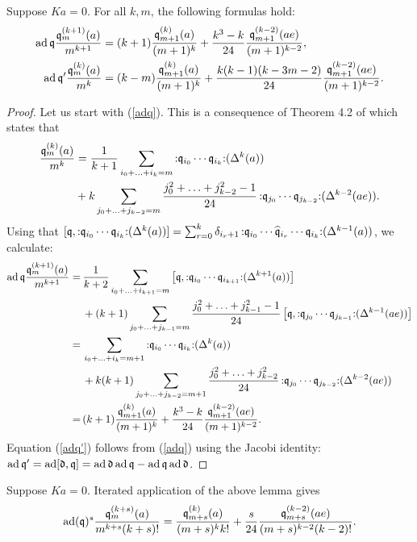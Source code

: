 \begin{lemma}
Suppose $Ka=0$.
For all $k,m$, the following formulas hold:
\begin{align}
\label{adq}
\operatorname{ad} \mathfrak{q}  \frac{\mathfrak{q}_m^{(k+1)}(a)}{m^{k+1}} & = (k+1)  \frac{\mathfrak{q}_{m+1}^{(k)}(a)}{(m+1)^{k}} + \frac{k^3-k}{24}\frac{\mathfrak{q}_{m+1}^{(k-2)}(ae)}{(m+1)^{k-2}} , \\
\label{adq'}
\operatorname{ad} \mathfrak{q}' \frac{\mathfrak{q}_m^{(k)}(a)}{m^k} & = (k-m) \frac{\mathfrak{q}_{m+1}^{(k)}(a)}{(m+1)^k}+ \frac{k(k-1)(k-3m-2)}{24}\frac{\mathfrak{q}_{m+1}^{(k-2)}(ae)}{(m+1)^{k-2}} .
\end{align}
\end{lemma}
\begin{proof}
Let us start with (\ref{adq}). This is a consequence of Theorem 4.2 of \cite{LiQinWang2} which states that 
\begin{align*}
\frac{\mathfrak{q}_m^{(k)}(a)}{m^k}
& = \frac{1}{k+1}\sum_{i_0+\ldots+i_k=m} \mathop{:}\nolimits\! \mathfrak{q}_{i_0}\cdots \mathfrak{q}_{i_k} \!\mathop{:}\nolimits  (\Delta^k(a)) \\
& +  k \sum_{j_0+\ldots+j_{k-2}=m} \frac{j_0^2+\ldots+j_{k-2}^2-1}{24}\mathop{:}\nolimits\! \mathfrak{q}_{j_0}\cdots \mathfrak{q}_{j_{k-2}} \!\mathop{:}\nolimits  (\Delta^{k-2}(ae)) .
\end{align*}
Using that 
$[\mathfrak{q},\mathop{:}\nolimits\! \mathfrak{q}_{i_0}\cdots \mathfrak{q}_{i_k} \!\mathop{:}\nolimits  (\Delta^k(a)) ] = \sum_{r=0}^k \delta_{i_r+1} \mathop{:}\nolimits\!\mathfrak{q}_{i_0}\cdots \widehat{\mathfrak{q}}_{i_r} \cdots \mathfrak{q}_{i_k} \!\mathop{:}\nolimits (\Delta^{k-1}(a))$, 
we calculate:
\begin{align*}
\ad\q \frac{\q_m^{(k+1)}(a)}{m^{k+1}} 
  =\, &\frac{1}{k+2}\sum_{i_0+\ldots+i_{k+1}=m} \left[\q,\nor \q_{i_0}\cdots \q_{i_{k+1}} \mal (\Delta^{k+1}(a))\right] \\
 & + (k+1) \sum_{j_0+\ldots+j_{k-1}=m} \frac{j_0^2+\ldots+j_{k-1}^2-1}{24}\left[\q,\nor \q_{j_0}\cdots \q_{j_{k-1}} \mal (\Delta^{k-1}(ae)) \right]\\
  =\, & \sum_{i_0+\ldots+i_{k}=m+1} \nor \q_{i_0}\cdots \q_{i_{k}} \mal  (\Delta^{k}(a)) \\
 & + k(k+1) \sum_{j_0+\ldots+j_{k-2}=m+1} \frac{j_0^2+\ldots+j_{k-2}^2}{24}\nor \q_{j_0}\cdots \q_{j_{k-2}} \mal (\Delta^{k-2}(ae)) \\
  =\, & (k+1)  \frac{\q_{m+1}^{(k)}(a)}{(m+1)^{k}} + \frac{k^3-k}{24}\frac{\q_{m+1}^{(k-2)}(ae)}{(m+1)^{k-2}}.
\end{align*}
Equation (\ref{adq'}) follows from (\ref{adq}) using the Jacobi identity: $\operatorname{ad} \mathfrak{q}' = \operatorname{ad} [\mathfrak d,\mathfrak{q}] = \operatorname{ad} \mathfrak d  \operatorname{ad} \mathfrak{q} - \operatorname{ad} \mathfrak{q}\operatorname{ad} \mathfrak d  $.
\end{proof}
\begin{corollary} \label{adqCorollary}
Suppose $Ka=0$.
Iterated application of the above lemma gives
 \begin{equation}
 \operatorname{ad}(\mathfrak{q})^s \frac{\mathfrak{q}_{m}^{(k+s)}(a)}{m^{k+s}(k+s)!} =\frac{\mathfrak{q}_{m+s}^{(k)}(a)}{(m+s)^kk!} + \frac{s}{24}\frac{\mathfrak{q}_{m+s}^{(k-2)}(ae)}{(m+s)^{k-2}(k-2)!}.
\end{equation}
\end{corollary}


